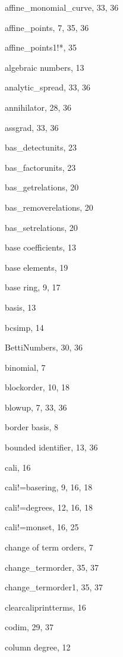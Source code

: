 \begin{theindex}

  \item affine\_monomial\_curve, 33, 36
  \item affine\_points, 7, 35, 36
  \item affine\_points1!*, 35
  \item algebraic numbers, 13
  \item analytic\_spread, 33, 36
  \item annihilator, 28, 36
  \item assgrad, 33, 36

  \indexspace

  \item bas\_detectunits, 23
  \item bas\_factorunits, 23
  \item bas\_getrelations, 20
  \item bas\_removerelations, 20
  \item bas\_setrelations, 20
  \item base coefficients, 13
  \item base elements, 19
  \item base ring, 9, 17
  \item basis, 13
  \item bcsimp, 14
  \item BettiNumbers, 30, 36
  \item binomial, 7
  \item blockorder, 10, 18
  \item blowup, 7, 33, 36
  \item border basis, 8
  \item bounded identifier, 13, 36

  \indexspace

  \item cali, 16
  \item cali!=basering, 9, 16, 18
  \item cali!=degrees, 12, 16, 18
  \item cali!=monset, 16, 25
  \item change of term orders, 7
  \item change\_termorder, 35, 37
  \item change\_termorder1, 35, 37
  \item clearcaliprintterms, 16
  \item codim, 29, 37
  \item column degree, 12

  \indexspace


\end{theindex}
